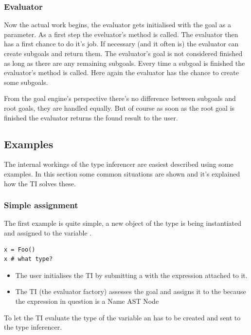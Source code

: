 \documentclass[12pt,halfparskip,DIV11,BCOR10mm]{scrreprt}
\begin{document}
\subsubsection{Evaluator}

Now the actual work begins, the evaluator gets initialised with the goal as a parameter. As a first step the eveluator's  method is called. The evaluator then has a first chance to do it's job. If necessary (and it often is) the evaluator can create subgoals and return them. The evaluator's goal is not considered finished as long as there are any remaining subgoals. Every time a subgoal is finished the evaluator's  method is called. Here again the evaluator has the chance to create some subgoals.

From the goal engine's perspective there's no difference between subgoals and root goals, they are handled equally. But of course as soon as the root goal is finished the evaluator returns the found result to the user.

\subsection{Examples}


The internal workings of the type inferencer are easiest described using some examples. In this section some common situations are shown and it's explained how the TI solves these.


\subsubsection{Simple assignment}

The first example is quite simple, a new object of the type  is being instantiated and assigned to the variable . 

\begin{lstlisting}
x = Foo()
x # what type?
\end{lstlisting}

\begin{itemize}
	\item The user initialises the TI by submitting a  with the expression  attached to it.
	\item The TI (the evaluator factory) assesses the goal and assigns it to the  because the expression in question is a Name AST Node
\end{itemize}
To let the TI evaluate the type of the variable  an  has to be created and sent to the type inferencer.
\end{document}
